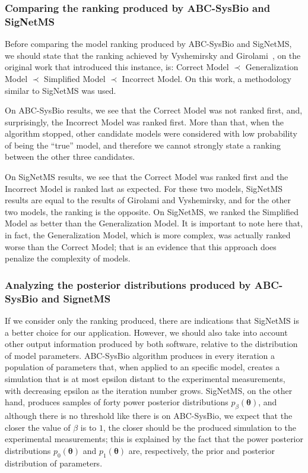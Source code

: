 \subsubsection{Comparing the ranking produced by ABC-SysBio and SigNetMS}
Before comparing the model ranking produced by ABC-SysBio and SigNetMS,
we should state that the ranking achieved by Vyshemirsky and 
Girolami~\cite{Vyshemirsky2007}, on the original work that introduced
this instance, is: Correct Model $\prec$ Generalization Model $\prec$
Simplified Model $\prec$ Incorrect Model. On this work, a methodology
similar to SigNetMS was used.

On ABC-SysBio results, we see that the Correct Model was not ranked
first, and, surprisingly, the Incorrect Model was ranked first. More
than that, when the algorithm stopped, other candidate models were
considered with low probability of being the ``true'' model, and
therefore we cannot strongly state a ranking between the other three
candidates.

On SigNetMS results, we see that the Correct Model was ranked first and 
the Incorrect Model is ranked last as expected. For these two models,
SigNetMS results are equal to the results of Girolami and Vyshemirsky,
and for the other two models, the ranking is the opposite. On SigNetMS,
we ranked the Simplified Model as better than the Generalization Model.
It is important to note here that, in fact, the Generalization Model,
which is more complex, was actually ranked worse than the Correct Model;
that is an evidence that this approach does penalize the complexity of
models.

\subsubsection{Analyzing the posterior distributions produced by
ABC-SysBio and SignetMS}
If we consider only the ranking produced, there are indications that 
SigNetMS is a better choice for our application. However, we should also
take into account other output information produced by both software, 
relative to the distribution of model parameters. ABC-SysBio algorithm 
produces in every iteration a population of parameters that, when 
applied to an specific model, creates a simulation that is at most 
epsilon distant to the experimental measurements, with decreasing 
epsilon as the iteration number grows. SigNetMS, on the other hand, 
produces samples of forty power posterior distributions 
$p_\beta({\bm \theta})$, and although there is no threshold like there 
is on ABC-SysBio, we expect that the closer the value of $\beta$ is to 
$1$, the closer should be the produced simulation to the experimental 
measurements; this is explained by the fact that the power posterior 
distributions $p_0({\bm \theta})$ and $p_1({\bm \theta})$ are, 
respectively, the prior and posterior distribution of parameters.

